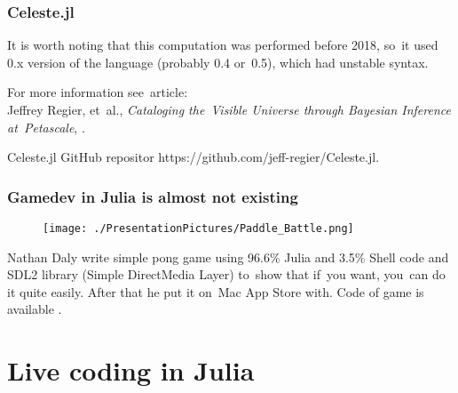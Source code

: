 \documentclass[10pt,t]{beamer}
\begin{document}
\begin{frame}
  \frametitle{Celeste.jl}


  It is worth noting that this computation was performed before 2018,
  so~it used 0.x version of the language (probably 0.4 or~0.5), which
  had unstable syntax.

  For more information see~article: \\
  Jeffrey Regier, et~al.,
  \textit{Cataloging the~Visible Universe through Bayesian Inference
    at~Petascale},
  .

  Celeste.jl GitHub repositor
  {https://github.com/jeff-regier/Celeste.jl}.

\end{frame}





\begin{frame}
  \frametitle{Gamedev in Julia is almost not existing}


  \begin{figure}

    \centering

    \texttt{[image: ./PresentationPictures/Paddle\_Battle.png]}

  \end{figure}


  Nathan Daly write simple pong game using 96.6\% Julia and 3.5\%
  Shell code and SDL2 library (Simple DirectMedia Layer) to~show that
  if~you want, you~can do it quite easily. After that he put it on~Mac
  App Store with. Code of game is available
  .

\end{frame}










\section{Live coding in Julia}
\end{document}
